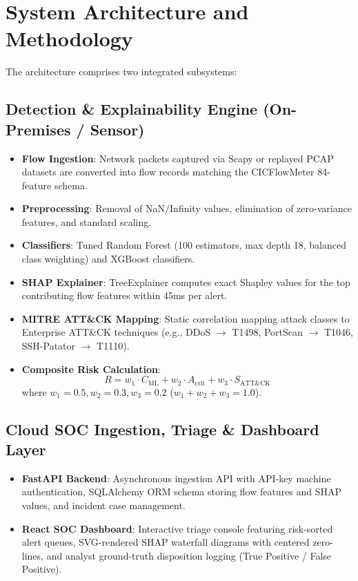 \documentclass[conference]{IEEEtran}
\begin{document}
\section{System Architecture and Methodology}
The architecture comprises two integrated subsystems:

\subsection{Detection \& Explainability Engine (On-Premises / Sensor)}
\begin{itemize}
    \item \textbf{Flow Ingestion}: Network packets captured via Scapy or replayed PCAP datasets are converted into flow records matching the CICFlowMeter 84-feature schema.
    \item \textbf{Preprocessing}: Removal of NaN/Infinity values, elimination of zero-variance features, and standard scaling.
    \item \textbf{Classifiers}: Tuned Random Forest (100 estimators, max depth 18, balanced class weighting) and XGBoost classifiers.
    \item \textbf{SHAP Explainer}: TreeExplainer computes exact Shapley values for the top contributing flow features within 45ms per alert.
    \item \textbf{MITRE ATT\&CK Mapping}: Static correlation mapping attack classes to Enterprise ATT\&CK techniques (e.g., DDoS $\rightarrow$ T1498, PortScan $\rightarrow$ T1046, SSH-Patator $\rightarrow$ T1110).
    \item \textbf{Composite Risk Calculation}:
    \begin{equation}
        R = w_1 \cdot C_{\text{ML}} + w_2 \cdot A_{\text{crit}} + w_3 \cdot S_{\text{ATT\&CK}}
    \end{equation}
    where $w_1 = 0.5, w_2 = 0.3, w_3 = 0.2$ ($w_1 + w_2 + w_3 = 1.0$).
\end{itemize}

\subsection{Cloud SOC Ingestion, Triage \& Dashboard Layer}
\begin{itemize}
    \item \textbf{FastAPI Backend}: Asynchronous ingestion API with API-key machine authentication, SQLAlchemy ORM schema storing flow features and SHAP values, and incident case management.
    \item \textbf{React SOC Dashboard}: Interactive triage console featuring risk-sorted alert queues, SVG-rendered SHAP waterfall diagrams with centered zero-lines, and analyst ground-truth disposition logging (True Positive / False Positive).
\end{itemize}
\end{document}
